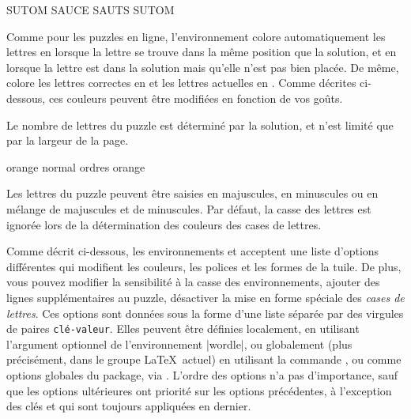 \documentclass[svgnames]{report}
\begin{document}
  \begin{example}
  \begin{wordle}{SUTOM}
    SAUCE
    SAUTS
    SUTOM
  \end{wordle}
  \end{example}

  Comme pour les puzzles en ligne, l'environnement 
  colore automatiquement les lettres en
  lorsque la lettre se trouve dans la même position que la solution, et en
   lorsque la lettre est dans la solution mais qu'elle n'est pas bien placée.
  De même,  colore les lettres correctes en
  et les lettres actuelles en
  .
  Comme décrites ci-dessous, ces couleurs peuvent être modifiées en fonction de vos goûts.

  Le nombre de lettres du puzzle est déterminé par la solution, et n'est limité que par la largeur de la page.

  \begin{example}
  \begin{GrilleSutom}[Lignes=4]{orange}
     normal
     ordres
     orange
  \end{GrilleSutom}
  \end{example}

  Les lettres du puzzle peuvent être saisies en majuscules, en minuscules ou en mélange de majuscules et de minuscules. Par défaut, la casse des lettres est ignorée lors de la détermination des couleurs des cases de lettres.

  Comme décrit ci-dessous, les environnements  et  acceptent une liste d'options différentes qui modifient les couleurs, les polices et les formes de la tuile. De plus, vous pouvez modifier la sensibilité à la casse des environnements, ajouter des lignes supplémentaires au puzzle, désactiver la mise en forme spéciale des \textit{cases de lettres}. Ces options sont données sous la forme d'une liste séparée par des virgules de paires \texttt{clé-valeur}. Elles peuvent être définies localement, en utilisant l'argument optionnel de l'environnement \keyword|wordle|, ou globalement (plus précisément, dans le groupe \LaTeX\ actuel) en utilisant la commande \keyword{\ParamsSutom} , ou comme options globales du package, via \keyword{\usepackage[options]{wordle}}. L'ordre des options n'a pas d'importance, sauf que les options ultérieures ont priorité sur les options précédentes, à l'exception des clés  et  qui sont toujours appliquées en dernier.
\end{document}
